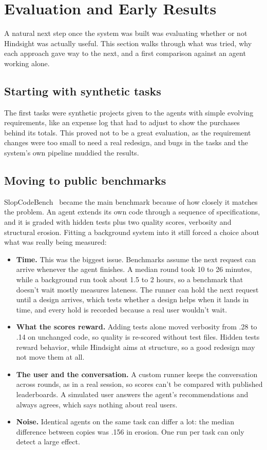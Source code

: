 \section{Evaluation and Early Results}
\label{sec:results}

A natural next step once the system was built was evaluating whether or not Hindsight was actually useful. This section walks through what was tried, why each approach gave way to the next, and a first comparison against an agent working alone.

\subsection{Starting with synthetic tasks}

The first tasks were synthetic projects given to the agents with simple evolving requirements, like an expense log that had to adjust to show the purchases behind its totals. This proved not to be a great evaluation, as the requirement changes were too small to need a real redesign, and bugs in the tasks and the system’s own pipeline muddied the results.

\subsection{Moving to public benchmarks}

SlopCodeBench~\cite{orlanski2026slopcode} became the main benchmark because of how closely it matches the problem. An agent extends its own code through a sequence of specifications, and it is graded with hidden tests plus two quality scores, verbosity and structural erosion. Fitting a background system into it still forced a choice about what was really being measured:

\begin{itemize}[nosep]
  \item \textbf{Time.} This was the biggest issue. Benchmarks assume the next request can arrive whenever the agent finishes. A median round took 10 to 26 minutes, while a background run took about 1.5 to 2 hours, so a benchmark that doesn't wait mostly measures lateness. The runner can hold the next request until a design arrives, which tests whether a design helps when it lands in time, and every hold is recorded because a real user wouldn't wait.
  \item \textbf{What the scores reward.} Adding tests alone moved verbosity from .28 to .14 on unchanged code, so quality is re-scored without test files. Hidden tests reward behavior, while Hindsight aims at structure, so a good redesign may not move them at all.
  \item \textbf{The user and the conversation.} A custom runner keeps the conversation across rounds, as in a real session, so scores can't be compared with published leaderboards. A simulated user answers the agent's recommendations and always agrees, which says nothing about real users.
  \item \textbf{Noise.} Identical agents on the same task can differ a lot: the median difference between copies was .156 in erosion. One run per task can only detect a large effect.
\end{itemize}

